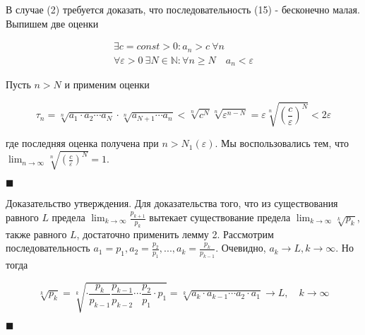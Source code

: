В случае (2) требуется доказать, что последовательность (15) - бесконечно малая. Выпишем две оценки

\begin{equation*}
	\begin{gathered}
		\exists c = const > 0: a_n > c\ \forall n \\
		\forall \varepsilon > 0\ \exists N\in \mathbb{N}: \forall n \geqslant N\quad a_n < \varepsilon
	\end{gathered}
\end{equation*}

Пусть $n > N$ и применим оценки

\begin{equation*}
	\tau_n = \sqrt[n]{a_1\cdot a_2 \cdots a_N} \cdot \sqrt[n]{a_{N + 1} \cdots a_n} < \sqrt[n]{c^N}\sqrt[n]{\varepsilon^{n - N}} = \varepsilon\sqrt[n]{\left( \frac{c}{\varepsilon} \right)^ N} < 2\varepsilon
\end{equation*}

где последняя оценка получена при $n > N_1(\varepsilon)$. Мы воспользовались тем, что $\displaystyle\lim_{n \rightarrow \infty}\sqrt[n]{\left( \frac{c}{\varepsilon} \right)^N} = 1$.

\begin{flushright}
	$\blacksquare$
\end{flushright}

Доказательство утверждения. Для доказательства того, что из существования равного $L$ предела  $\displaystyle\lim_{k \rightarrow \infty} \frac{p_{k + 1}}{p_k}$ вытекает существование предела $\displaystyle\lim_{k \rightarrow \infty} \sqrt[k]{p_k}$, также равного $L$, достаточно применить лемму 2. Рассмотрим последовательность $a_1 = p_1, a_2 = \frac{p_2}{p_1}, ..., a_k = \frac{p_k}{p_{k - 1}}$. Очевидно, $a_k \rightarrow L, k\rightarrow \infty$. Но тогда

\begin{equation*}
	\sqrt[k]{p_k} = \sqrt[k]{\cdot \frac{p_k}{p_{k - 1}} \frac{p_{k - 1}}{p_{k - 2}} \cdots \frac{p_2}{p_1} \cdot p_1} = \sqrt[k]{a_k \cdot a_{k - 1} \cdots a_2 \cdot  a_1} \rightarrow L,\quad k \rightarrow \infty
\end{equation*}

\begin{flushright}
	$\blacksquare$
\end{flushright}